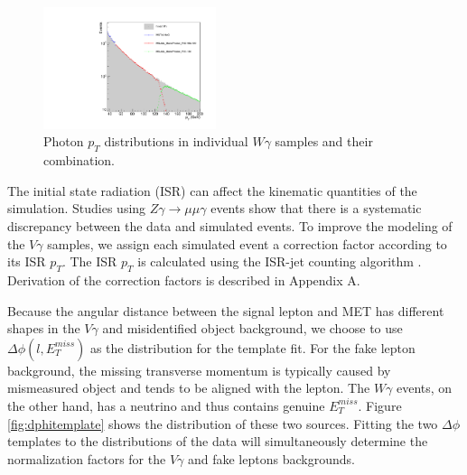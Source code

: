 \documentclass[thesis.tex]{subfiles}
\renewcommand\_{\textunderscore\allowbreak}
\begin{document}
\begin{figure}
  \centering
    \includegraphics[width=0.45\textwidth]{Figures/WGMixing.pdf}
  \caption{Photon $p_T$ distributions in individual $W\gamma$ samples and their combination.}
    \label{fig:mixWG}
\end{figure}

The initial state radiation (ISR) can affect the kinematic quantities of the simulation. Studies using $Z\gamma\rightarrow\mu\mu\gamma$ events show that there is a systematic discrepancy between the data and simulated events. To improve the modeling of the $V\gamma$ samples, we assign each simulated event a correction factor according to its ISR $p_T$. The ISR $p_T$ is calculated using the ISR-jet counting algorithm \cite{ISR-JET-ALGO}. Derivation of the correction factors is described in Appendix A. 

Because the angular distance between the signal lepton and MET has different shapes in the $V\gamma$ and misidentified object background, we choose to use $\Delta\phi(l,E_{T}^{miss})$ as the distribution for the template fit. For the fake lepton background, the missing transverse momentum is typically caused by mismeasured object and tends to be aligned with the lepton. The $W\gamma$ events, on the other hand, has a neutrino and thus contains genuine $E_{T}^{miss}$. Figure \ref{fig:dphitemplate} shows the distribution of these two sources. Fitting the two $\Delta\phi$ templates to the distributions of the data will simultaneously determine the normalization factors for the $V\gamma$ and fake leptons backgrounds. 
\end{document}
